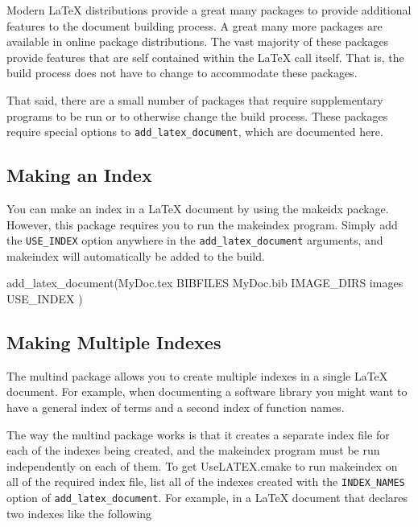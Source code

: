\documentclass{article}
\newcommand*{\textfile}[1]{\textsf{#1}}
\newcommand*{\textprog}[1]{\textfile{#1}}
\newcommand*{\textlatexpackage}[1]{\textsf{#1}}
\newcommand*{\textcmake}[1]{\texttt{#1}}
\newcommand*{\UseLATEX}{\textfile{UseLATEX.cmake}\xspace}
\newcommand*{\latex}{\LaTeX\xspace}
\newcommand*{\ald}{\textcmake{add\_latex\_document}\xspace}
\begin{document}
  Modern \latex distributions provide a great many packages to provide
  additional features to the document building process.  A great many more
  packages are available in online package distributions.  The vast
  majority of these packages provide features that are self contained
  within the \latex call itself.  That is, the build process does not have
  to change to accommodate these packages.

  That said, there are a small number of packages that require
  supplementary programs to be run or to otherwise change the build
  process.  These packages require special options to \ald, which are
  documented here.

  \subsection{Making an Index}
  \label{sec:MakingAnIndex}

  You can make an index in a \latex document by using the
  \textlatexpackage{makeidx} package. However, this package requires you to
  run the \textprog{makeindex} program. Simply add the
  \textcmake{USE\_INDEX} option anywhere in the \ald arguments, and
  \textprog{makeindex} will automatically be added to the build.

  \begin{CodeListing}
add_latex_document(MyDoc.tex
  BIBFILES MyDoc.bib
  IMAGE_DIRS images
  USE_INDEX
  )
  \end{CodeListing}

  \subsection{Making Multiple Indexes}
  \label{sec:MakingMultipleIndexes}

  The \textlatexpackage{multind} package allows you to create multiple
  indexes in a single \latex document. For example, when documenting a
  software library you might want to have a general index of terms and a
  second index of function names.

  The way the \textlatexpackage{multind} package works is that it creates a
  separate index file for each of the indexes being created, and the
  \textprog{makeindex} program must be run independently on each of them.
  To get \UseLATEX to run \textprog{makeindex} on all of the required index
  file, list all of the indexes created with the \textcmake{INDEX\_NAMES}
  option of \ald. For example, in a \latex document that declares two
  indexes like the following
\end{document}
